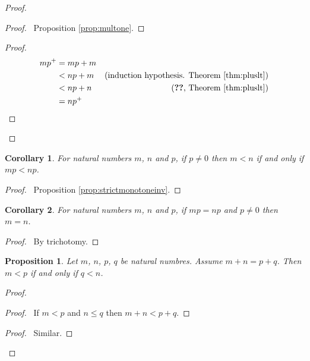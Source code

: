 \documentclass{book}
\let\qed\relax
\newtheorem{prop}[ax]{Proposition}
\newtheorem{cor}{Corollary}[ax]
\theoremstyle{definition}
\begin{document}
\begin{proof}
\pf
{}
\begin{proof}
	\pf\ Proposition \ref{prop:multone}.
\end{proof}
\begin{proof}
	\pf
	\begin{align*}
		mp^+ & = mp + m \\
		& < np + m & (\text{induction hypothesis. Theorem \ref{thm:pluslt}}) \\
		& < np + n & (\text{\stepref{2}, Theorem \ref{thm:pluslt}}) \\
		& = np^+
	\end{align*}
\end{proof}
\qed
\end{proof}

\begin{cor}
For natural numbers $m$, $n$ and $p$, if $p \neq 0$ then $m < n$ if and only if $mp < np$.
\end{cor}

\begin{proof}
	\pf\ Proposition \ref{prop:strictmonotoneinv}. \qed
\end{proof}

\begin{cor}
For natural numbers $m$, $n$ and $p$, if $mp = np$ and $p \neq 0$ then $m = n$.
\end{cor}

\begin{proof}
	\pf\ By trichotomy. \qed
\end{proof}

\begin{prop}
\label{prop:intltlemma}
Let $m$, $n$, $p$, $q$ be natural numbres. Assume $m + n = p + q$. Then $m < p$ if and only if $q < n$.
\end{prop}

\begin{proof}
\pf
{}
\begin{proof}
	\pf\ If $m < p$ and $n \leq q$ then $m+n < p + q$.
\end{proof}
\begin{proof}
	\pf\ Similar.
\end{proof}
\qed
\end{proof}
\end{document}
